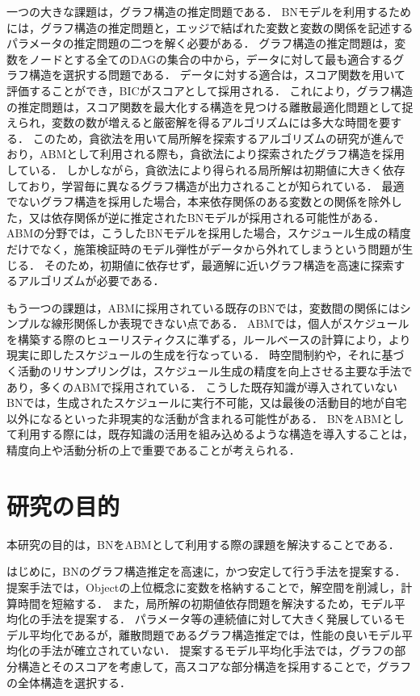 一つの大きな課題は，グラフ構造の推定問題である．
BNモデルを利用するためには，グラフ構造の推定問題と，エッジで結ばれた変数と変数の関係を記述するパラメータの推定問題の二つを解く必要がある．
グラフ構造の推定問題は，変数をノードとする全てのDAGの集合の中から，データに対して最も適合するグラフ構造を選択する問題である．
データに対する適合は，スコア関数を用いて評価することができ，BICがスコアとして採用される\cite{Baydin2018}．
これにより，グラフ構造の推定問題は，スコア関数を最大化する構造を見つける離散最適化問題として捉えられ，変数の数が増えると厳密解を得るアルゴリズムには多大な時間を要する\cite{Baydin2018}．
このため，貪欲法を用いて局所解を探索するアルゴリズムの研究が進んでおり\cite{Baydin2018}，ABMとして利用される際も，貪欲法により探索されたグラフ構造を採用している．
しかしながら，貪欲法により得られる局所解は初期値に大きく依存しており，学習毎に異なるグラフ構造が出力されることが知られている\cite{Baydin2018}．
最適でないグラフ構造を採用した場合，本来依存関係のある変数との関係を除外した，又は依存関係が逆に推定されたBNモデルが採用される可能性がある．
ABMの分野では，こうしたBNモデルを採用した場合，スケジュール生成の精度だけでなく，施策検証時のモデル弾性がデータから外れてしまうという問題が生じる．
そのため，初期値に依存せず，最適解に近いグラフ構造を高速に探索するアルゴリズムが必要である．

もう一つの課題は，ABMに採用されている既存のBNでは，変数間の関係にはシンプルな線形関係しか表現できない点である\cite{Baydin2018}．
ABMでは，個人がスケジュールを構築する際のヒューリスティクスに準ずる，ルールベースの計算により，より現実に即したスケジュールの生成を行なっている．
時空間制約や，それに基づく活動のリサンプリングは，スケジュール生成の精度を向上させる主要な手法であり，多くのABMで採用されている\cite{Baydin2018}．
こうした既存知識が導入されていないBNでは，生成されたスケジュールに実行不可能，又は最後の活動目的地が自宅以外になるといった非現実的な活動が含まれる可能性がある．
BNをABMとして利用する際には，既存知識の活用を組み込めるような構造を導入することは，精度向上や活動分析の上で重要であることが考えられる．

\section{研究の目的}\label{1.2}
本研究の目的は，BNをABMとして利用する際の課題を解決することである．

はじめに，BNのグラフ構造推定を高速に，かつ安定して行う手法を提案する．
提案手法では，Objectの上位概念に変数を格納することで，解空間を削減し，計算時間を短縮する．
また，局所解の初期値依存問題を解決するため，モデル平均化の手法を提案する．
パラメータ等の連続値に対して大きく発展しているモデル平均化であるが\cite{Baydin2018}，離散問題であるグラフ構造推定では，性能の良いモデル平均化の手法が確立されていない\cite{Baydin2018}．
提案するモデル平均化手法では，グラフの部分構造とそのスコアを考慮して，高スコアな部分構造を採用することで，グラフの全体構造を選択する．


